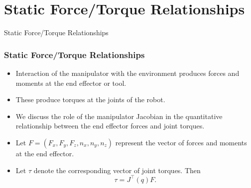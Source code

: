\section{Static Force/Torque Relationships}

\begin{frame}
    Static Force/Torque Relationships


\end{frame}

\begingroup
\small


\begin{frame}
    \frametitle{Static Force/Torque Relationships}

    \begin{itemize}
        \item Interaction of the manipulator with the environment produces
        forces and moments at the end effector or tool.
        \item These produce torques at the joints of the robot.\footnotemark
        \item We discuss the role of the manipulator Jacobian in the
        quantitative relationship between the end effector forces and joint
        torques.
        \item Let $F = (F_x, F_y, F_z, n_x, n_y, n_z)$ represent the vector of 
        forces and moments at the end effector.
        \item Let $\tau$ denote the corresponding vector of joint torques. Then 
        \begin{equation}
            \boxed{\tau = J^\top(q) F.}
            \label{eq:static_force_torque}
        \end{equation} 
    \end{itemize}

\end{frame}


